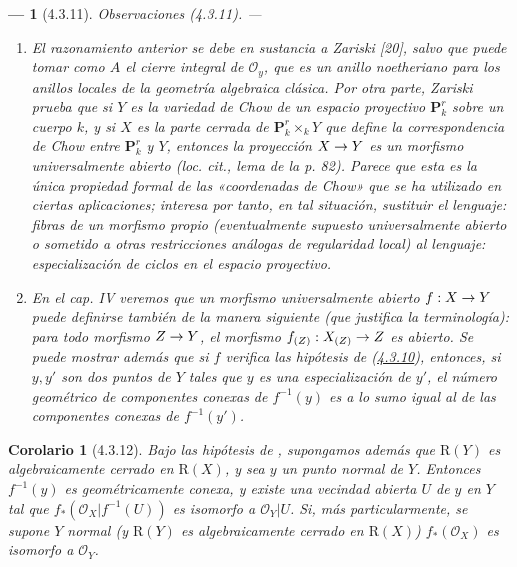 \documentclass[10pt,oneside,openany]{book}
\theoremstyle{egaenv}\newtheorem*{env}{---}
\theoremstyle{egastatement}
\newtheorem*{corollary}{Corolario}
\theoremstyle{egadescription}
\renewcommand{\to}{\mathchoice{\longrightarrow}{\rightarrow}{\rightarrow}{\rightarrow}}
\begin{document}
\begin{env}[4.3.11]
\label{III.4.3.11-fr}
\emph{Observaciones} (4.3.11). ---
\begin{enumerate}
\item[(i)] El razonamiento anterior se debe en sustancia a Zariski [20],
salvo que puede tomar como $A$ el cierre integral de
$\mathcal O_y$, que es un anillo noetheriano para los anillos locales
de la geometría algebraica clásica. Por otra parte, Zariski prueba que si
$Y$ es la variedad de Chow de un espacio proyectivo $\mathbf P_k^r$ sobre un
cuerpo $k$, y si $X$ es la parte cerrada de $\mathbf P_k^r\times_kY$ que
define la correspondencia de Chow entre $\mathbf P_k^r$ y $Y$, entonces la
proyección $X\to Y$ es un morfismo universalmente abierto
(\emph{loc. cit.}, lema de la p. 82). Parece que esta es la única
propiedad formal de las «coordenadas de Chow» que se ha utilizado en
ciertas aplicaciones; interesa por tanto, en tal situación,
sustituir el lenguaje: fibras de un morfismo propio (eventualmente
supuesto universalmente abierto o sometido a otras restricciones análogas
de regularidad local) al lenguaje: especialización de ciclos en el espacio
proyectivo.

\item[(ii)] En el cap. IV veremos que un morfismo universalmente abierto
$f:X\to Y$ puede definirse también de la manera siguiente (que justifica la
terminología): para \emph{todo} morfismo $Z\to Y$, el morfismo
$f_{(Z)}:X_{(Z)}\to Z$ es \emph{abierto}. Se puede mostrar además que si $f$
verifica las hipótesis de (\hyperref[III.4.3.10-fr]{4.3.10}), entonces, si
$y,y'$ son dos puntos de $Y$ tales que $y$ es una \emph{especialización} de $y'$,
el número geométrico de componentes conexas de $f^{-1}(y)$ es a lo sumo
igual al de las componentes conexas de $f^{-1}(y')$.
\end{enumerate}
\end{env}

\begin{corollary}[4.3.12]
\label{III.4.3.12}
\label{III.4.3.12-fr}
Bajo las hipótesis de , supongamos además que
$\mathrm R(Y)$ es algebraicamente cerrado en $\mathrm R(X)$, y sea
$y$ un punto normal de $Y$. Entonces $f^{-1}(y)$ es geométricamente
conexa, y existe una vecindad abierta $U$ de $y$ en $Y$ tal que
$f_*(\mathcal O_X|f^{-1}(U))$ es isomorfo a $\mathcal O_Y|U$. Si, más
particularmente, se supone $Y$ normal (y $\mathrm R(Y)$ es algebraicamente
cerrado en $\mathrm R(X)$) $f_*(\mathcal O_X)$ es isomorfo a
$\mathcal O_Y$.
\end{corollary}
\end{document}

